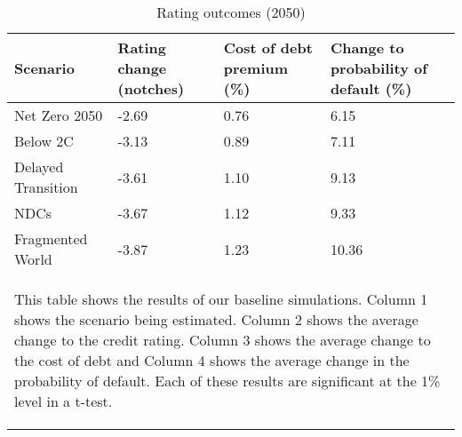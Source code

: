 
\begin{table}[tb!]
\footnotesize
\center
\caption{Rating outcomes (2050)}
\label{tab:rat}
\begin{tabularx}{\textwidth}{X X X X}
\hline
Scenario & Rating change (notches) & Cost of debt premium (\%) & Change to probability of default (\%) \\
\hline
Net Zero 2050 & -2.69  &  0.76  &  6.15  \\
Below 2C & -3.13  &  0.89  &  7.11 \\
Delayed Transition & -3.61  &  1.10  &  9.13 \\
NDCs & -3.67  &  1.12  &  9.33 \\
Fragmented World & -3.87  &  1.23  &  10.36 \\
\hline
\multicolumn{4}{p{\textwidth}}{\begin{footnotesize}This table shows the results of our baseline simulations. Column 1 shows the scenario being estimated. Column 2 shows the average change to the credit rating. Column 3 shows the average change to the cost of debt and Column 4 shows the average change in the probability of default. Each of these results are significant at the 1\% level in a t-test.
\end{footnotesize}
}
\end{tabularx}
\end{table}
